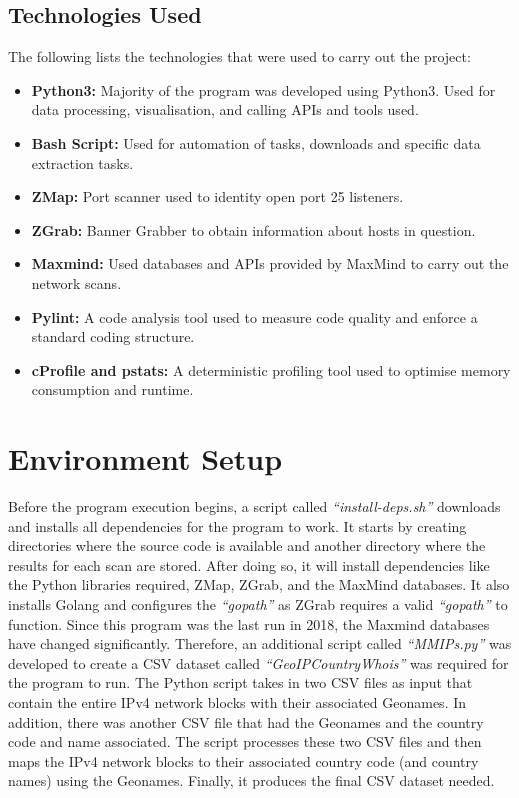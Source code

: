 \subsection{Technologies Used}
The following lists the technologies that were used to carry out the project:
\begin{itemize}
    \item \textbf{Python3:} Majority of the program was developed using Python3. Used for data processing, visualisation, and calling APIs and tools used.
    \item \textbf{Bash Script:} Used for automation of tasks, downloads and specific data extraction tasks.
    \item \textbf{ZMap:} Port scanner used to identity open port 25 listeners. 
    \item \textbf{ZGrab:} Banner Grabber to obtain information about hosts in question.
    \item \textbf{Maxmind:} Used databases and APIs provided by MaxMind to carry out the network scans.
    \item \textbf{Pylint:} A code analysis tool used to measure code quality and enforce a standard coding structure. 
    \item \textbf{cProfile and pstats:} A deterministic profiling tool used to optimise memory consumption and runtime.
\end{itemize}

\section{Environment Setup}
\label{envsetup}
Before the program execution begins, a script called \textit{``install-deps.sh''} downloads and installs all dependencies for the program to work. It starts by creating directories where the source code 
is available and another directory where the results for each scan are stored. After doing so, it will install dependencies like the Python libraries required, ZMap, ZGrab, and the MaxMind databases. 
It also installs Golang and configures the \textit{``gopath''} as ZGrab requires a valid \textit{``gopath''} to function. Since this program was the last run in 2018, the Maxmind databases have changed significantly. Therefore, 
an additional script called \textit{``MMIPs.py''} was developed to create a CSV dataset called \textit{``GeoIPCountryWhois''} was required for the program to run. The Python script takes in two CSV files as input that 
contain the entire IPv4 network blocks with their associated Geonames. In addition, there was another CSV file that had the Geonames and the country code and name associated. The script 
processes these two CSV files and then maps the IPv4 network blocks to their associated country code (and country names) using the Geonames. Finally, it produces the final CSV dataset needed.

